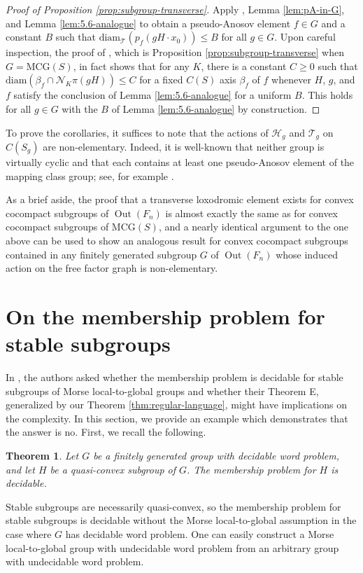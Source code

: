\documentclass[11pt,letterpaper]{amsart}
\newtheorem{theorem}{Theorem}[section]
\theoremstyle{definition}
\theoremstyle{plain}
\theoremstyle{TheoremNum}
\DeclareMathOperator{\Out}{\mathrm{Out}}
\begin{document}
\begin{proof}[Proof of Proposition \ref{prop:subgroup-transverse}]
    Apply \cite[Theorem~5.1]{Abbott-Hull}, Lemma \ref{lem:pA-in-G}, and Lemma \ref{lem:5.6-analogue} to obtain a pseudo-Anosov element $f \in G$ and a constant $B$ such that $\text{diam}_{\mathcal{T}}(p_f (gH\cdot x_0)) \leq B$ for all $g \in G$. Upon careful inspection, the proof of \cite[Proposition~6.9]{Abbott-Hull}, which is Proposition \ref{prop:subgroup-transverse} when $G = \text{MCG}(S)$, in fact shows that for any $K$, there is a constant $C \geq 0$ such that $\text{diam}(\beta_f  \cap \mathcal{N}_K \pi(gH)) \leq C$ for a fixed $C(S)$ axis $\beta_f$ of $f$ whenever $H$, $g$, and $f$ satisfy the conclusion of Lemma \ref{lem:5.6-analogue} for a uniform $B$. This holds for all $g \in G$ with the $B$ of Lemma \ref{lem:5.6-analogue} by construction.
\end{proof}
To prove the corollaries, it suffices to note that the actions of $\mathcal{H}_g$ and $\mathcal{T}_g$ on $C(S_g)$ are non-elementary. Indeed, it is well-known that neither group is virtually cyclic and that each contains at least one pseudo-Anosov element of the mapping class group; see, for example \cite{Hensel-handlebody-primer,pA-generic-Torelli}. 

As a brief aside, the proof that a transverse loxodromic element exists for convex cocompact subgroups of $\Out(F_n)$ is almost exactly the same as for convex cocompact subgroups of $\mathrm{MCG}(S)$, and a nearly identical argument to the one above can be used to show an analogous result for convex cocompact subgroups contained in any finitely generated subgroup $G$ of $\Out(F_n)$ whose induced action on the free factor graph is non-elementary.


\section{On the membership problem for stable subgroups}
In \cite[Question~3]{CRSZ}, the authors asked whether the membership problem is decidable for stable subgroups of Morse local-to-global groups and whether their Theorem E, generalized by our Theorem \ref{thm:regular-language}, might have implications on the complexity. In this section, we provide an example which demonstrates that the answer is no. First, we recall the following.

\begin{theorem}\cite[Theorem~3]{Gitik-membership}
    Let $G$ be a finitely generated group with decidable word problem, and let $H$ be a quasi-convex subgroup of $G$. The membership problem for $H$ is decidable.
\end{theorem}
Stable subgroups are necessarily quasi-convex, so the membership problem for stable subgroups is decidable without the Morse local-to-global assumption in the case where $G$ has decidable word problem. One can easily construct a Morse local-to-global group with undecidable word problem from an arbitrary group with undecidable word problem.
\end{document}
